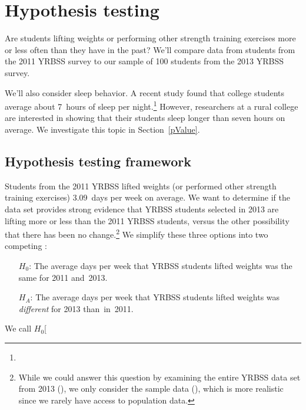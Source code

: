 


\section[Hypothesis testing]{Hypothesis testing }
\label{hypothesisTesting}


Are students lifting weights or performing other strength training exercises more or less often than they have in the past? We'll compare data from students from the 2011 YRBSS survey to our sample of 100 students from the 2013 YRBSS survey.

We'll also consider sleep behavior. A recent study found that college students average about 7~hours of sleep per night.\footnote{} However, researchers at a rural college are interested in showing that their students sleep longer than seven hours on average. We investigate this topic in Section~\ref{pValue}.

\subsection{Hypothesis testing framework}

Students from the 2011 YRBSS lifted weights (or performed other strength training exercises) 3.09~days per week on average. We want to determine if the  data set provides strong evidence that YRBSS students selected in 2013 are lifting more or less than the 2011 YRBSS students, versus the other possibility that there has been no change.\footnote{While we could answer this question by examining the entire YRBSS data set from 2013 (), we only consider the sample data (), which is more realistic since we rarely have access to population data.} We simplify these three options into two competing :
\begin{itemize}
\setlength{\itemsep}{0mm}
\item[$H_0$:] The average days per week that YRBSS students lifted weights was the same for 2011 and~2013.
\item[$H_A$:] The average days per week that YRBSS students lifted weights was \emph{different} for 2013 than~in~2011.
\end{itemize}
We call $H_0$\marginpar[\raggedright\vspace{6mm}

